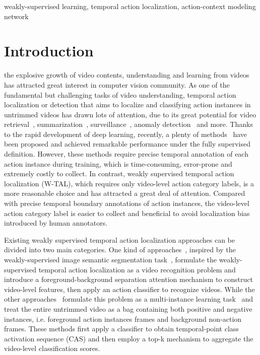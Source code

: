 \documentclass[journal,comsoc]{IEEEtran}
\begin{document}
\begin{IEEEkeywords}
weakly-supervised learning, temporal action localization, action-context modeling network
\end{IEEEkeywords}



\section{Introduction}

\par {} the explosive growth of video contents, understanding and learning from videos has attracted great interest in computer vision community. As one of the fundamental but challenging tasks of video understanding, temporal action localization or detection that aims to localize and classifying action instances in untrimmed videos has drawn lots of attention, due to its great potential for video retrieval~\cite{video_retrieval_1, video_retrieval_2}, summarization~\cite{video_summarization_1}, surveillance~\cite{video_surveillance_1, video_surveillance_2}, anomaly detection~\cite{video_anomaly_detection} and more. Thanks to the rapid development of deep learning, recently, a plenty of methods~\cite{SSN, BSN, BMN, BSN++} have been proposed and achieved remarkable performance under the fully supervised definition. However, these methods require precise temporal annotation of each action instance during training, which is time-consuming, error-prone and extremely costly to collect. In contrast, weakly supervised temporal action localization (W-TAL), which requires only video-level action category labels, is a more reasonable choice and has attracted a great deal of attention. Compared with precise temporal boundary annotations of action instances, the video-level action category label is easier to collect and beneficial to avoid localization bias introduced by human annotators.

\par Existing weakly supervised temporal action localization approaches can be divided into two main categories. One kind of approaches~\cite{STPN, A2CLPT, TSM, background_modeling, IWONet}, inspired by the weakly-supervised image semantic segmentation task~\cite{weakly_seg_1, weakly_seg_2, weakly_seg_3}, formulate the weakly-supervised temporal action localization as a video recognition problem and introduce a foreground-background separation attention mechanism to construct video-level features, then apply an action classifier to recognize videos. While the other approaches~\cite{WTALC, MAAN, BASNet, EMMIL} formulate this problem as a multi-instance learning task~\cite{MIL} and treat the entire untrimmed video as a bag containing both positive and negative instances, i.e. foreground action instances frames and background non-action frames. These methods first apply a classifier to obtain temporal-point class activation sequence (CAS) and then employ a top-k mechanism to aggregate the video-level classification scores. 
\end{document}
